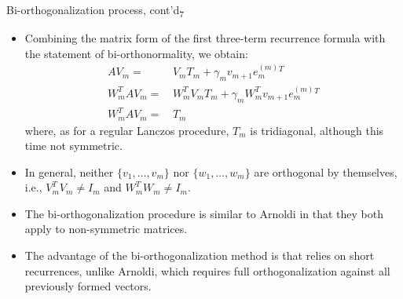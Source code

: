 \documentclass[t,usepdftitle=false]{beamer}
\begin{document}
\begin{frame}{Bi-orthogonalization process, cont'd\textsubscript{7}}
\begin{itemize}
\item Combining the matrix form of the first three-term recurrence formula with the statement of bi-orthonormality, we obtain:
\begin{align*}
AV_m=&\,V_mT_m+\gamma_mv_{m+1}e_m^{(m)}{}^T\\
W_m^TAV_m=&\,W_m^TV_mT_m+\gamma_mW_m^Tv_{m+1}e_m^{(m)}{}^T\\
W_m^TAV_m=&\,T_m
\end{align*}
where, as for a regular Lanczos procedure, $T_m$ is tridiagonal, although this time not symmetric.
\item In general, neither $\{v_1,\dots,v_m\}$ nor $\{w_1,\dots,w_m\}$ are orthogonal by themselves, i.e., $V_m^TV_m\neq I_m$ and $W_m^TW_m\neq I_m$.
\item The bi-orthogonalization procedure is similar to Arnoldi in that they both apply to non-symmetric matrices.
\item[] The advantage of the bi-orthogonalization method is that relies on short recurrences, unlike Arnoldi, which requires full orthogonalization against all previously formed vectors.
\end{itemize}
\end{frame}
\end{document}
